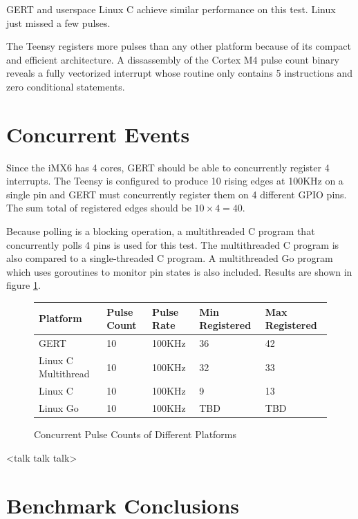 GERT and userspace Linux C achieve similar performance on this test.
Linux just missed a few pulses.

The Teensy registers more pulses than any other platform because of its
compact and efficient architecture. A dissassembly of the Cortex M4 pulse count binary
reveals a fully vectorized interrupt whose routine only contains 5
instructions and zero conditional statements.

\section{Concurrent Events}\label{sec:concurrency}
Since the iMX6 has 4 cores, GERT should be able to concurrently
register 4 interrupts. The Teensy is configured to produce 10 rising edges
at 100KHz on a single pin and GERT must concurrently register them on 4 different
GPIO pins. The sum total of registered edges should be $10\times4=40$.

Because polling is a blocking operation, a multithreaded C program that concurrently
polls 4 pins is used for this test. The multithreaded C program is also compared
to a single-threaded C program. A multithreaded Go program which uses goroutines
to monitor pin states is also included.
Results are shown in figure \ref{fig:ccounter}.

\begin{figure} [h]
\begin{center}
  \begin{tabular}{ | l | l | l | l | l |}
    \hline
    Platform & Pulse Count & Pulse Rate & Min Registered & Max Registered \\ \hline
    GERT & 10 & 100KHz & 36 & 42 \\ \hline
    Linux C Multithread & 10 & 100KHz & 32 & 33 \\ \hline
    Linux C & 10 & 100KHz & 9 & 13 \\ \hline
    Linux Go & 10 & 100KHz & TBD & TBD \\
    \hline
  \end{tabular}
\end{center}
  \caption{Concurrent Pulse Counts of Different Platforms}  \label{fig:ccounter}
\end{figure}


<talk talk talk>

\section{Benchmark Conclusions}

